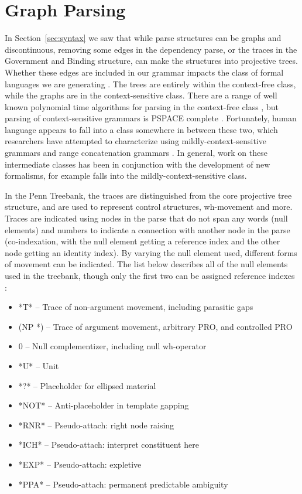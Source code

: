 \section{Graph Parsing} \label{sec:intro-graph}

In Section~\ref{sec:syntax} we saw that while parse structures can be graphs and discontinuous, removing some edges in the dependency parse, or the traces in the Government and Binding structure, can make the structures into projective trees.
Whether these edges are included in our grammar impacts the class of formal languages we are generating \parencite{Chomsky-grammars}.
The trees are entirely within the context-free class, while the graphs are in the context-sensitive class.
There are a range of well known polynomial time algorithms for parsing in the context-free class \parencite{Cocke:1969,Younger:1967,Kasami:1966,Earley:1970,Lang:1974}, but parsing of context-sensitive grammars is PSPACE complete \parencite{Kuroda:1964,Savitch:1970}.
Fortunately, human language appears to fall into a class somewhere in between these two, which researchers have attempted to characterize using mildly-context-sensitive grammars \textcite{weir-joshi:1988:ACL} and range concatenation grammars \parencite{Boullier:1998}.
In general, work on these intermediate classes has been in conjunction with the development of new formalisms, for example \ccg falls into the mildly-context-sensitive class.

In the Penn Treebank, the traces are distinguished from the core projective tree structure, and are used to represent control structures, wh-movement and more.
Traces are indicated using nodes in the parse that do not span any words (null elements) and numbers to indicate a connection with another node in the parse (co-indexation, with the null element getting a reference index and the other node getting an identity index).
By varying the null element used, different forms of movement can be indicated.
The list below describes all of the null elements used in the treebank, though only the first two can be assigned reference indexes \parencite{ptb-guide}:

\begin{itemize}
  \item *T* -- Trace of non-argument movement, including parasitic gaps
  \item (NP *) -- Trace of argument movement, arbitrary PRO, and controlled PRO
  \item 0 -- Null complementizer, including null wh-operator
  \item *U* -- Unit
  \item *?* -- Placeholder for ellipsed material
  \item *NOT* -- Anti-placeholder in template gapping
  \item *RNR* -- Pseudo-attach: right node raising
  \item *ICH* -- Pseudo-attach: interpret constituent here
  \item *EXP* -- Pseudo-attach: expletive
  \item *PPA* -- Pseudo-attach: permanent predictable ambiguity
\end{itemize}

